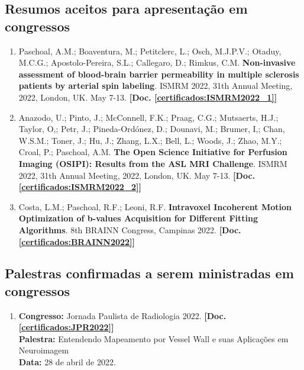 \documentclass[a4paper,oneside,10pt]{article}
\begin{document}
\subsection{Resumos aceitos para apresentação em congressos}
\vspace{0.3cm}

\begin{enumerate}
\renewcommand{\labelenumi}{{\large\bfseries\arabic{enumi}.}}

        \item Paschoal, A.M.; Boaventura, M.; Petitclerc, L.; Osch, M.J.P.V.; Otaduy, M.C.G.; Apostolo-Pereira, S.L.; Callegaro, D.; Rimkus, C.M. \textbf{Non-invasive assessment of blood-brain barrier permeability in multiple sclerosis patients by arterial spin labeling}. ISMRM 2022, 31th Annual Meeting, 2022, London, UK. May 7-13. \textbf{[Doc. \ref{certificados:ISMRM2022_1}]}

        \item Anazodo, U.; Pinto, J.; McConnell, F.K.; Praag, C.G.; Mutsaerts, H.J.; Taylor, O,; Petr, J.; Pineda-Ordónez, D.; Dounavi, M.; Brumer, I,; Chan, W.S.M.; Toner, J.; Hu, J.; Zhang, L.X.; Bell, L.; Woods, J.; Zhao, M.Y.; Croal, P.; Paschoal, A.M. \textbf{The Open Science Initiative for Perfusion Imaging (OSIPI): Results from the ASL MRI Challenge}. ISMRM 2022, 31th Annual Meeting, 2022, London, UK. May 7-13. \textbf{[Doc. \ref{certificados:ISMRM2022_2}]}

        \item Costa, L.M.; Paschoal, R.F.; Leoni, R.F. \textbf{Intravoxel Incoherent Motion Optimization of b-values Acquisition for Different Fitting Algorithms}. 8th BRAINN Congress, Campinas 2022. \textbf{[Doc. \ref{certificados:BRAINN2022}]}
\end{enumerate}

\subsection{Palestras confirmadas a serem ministradas em congressos}
\vspace{0.3cm}

\begin{enumerate}
\renewcommand{\labelenumi}{{\large\bfseries\arabic{enumi}.}}

        \item \textbf{Congresso:} Jornada Paulista de Radiologia 2022. \textbf{[Doc. \ref{certificados:JPR2022}]} \\
              \textbf{Palestra:} Entendendo Mapeamento por Vessel Wall e suas Aplicações em Neuroimagem\\
              \textbf{Data:} 28 de abril de 2022.
\end{enumerate}
\end{document}
